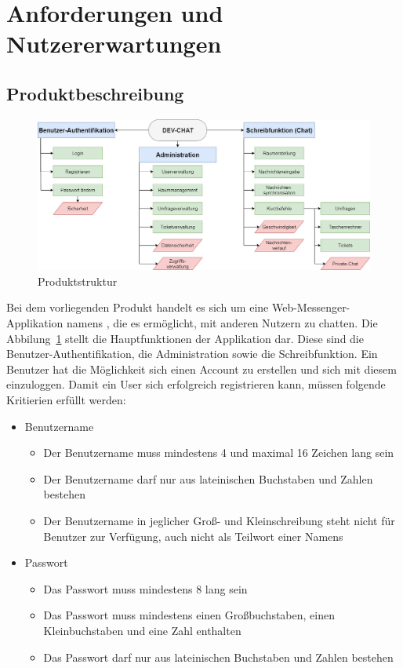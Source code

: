 \section{Anforderungen und Nutzererwartungen}

\subsection{Produktbeschreibung}
\begin{figure}
  \centering
  \includegraphics[width=1\textwidth, keepaspectratio]{images/Produktstruktur.png}
  \caption{Produktstruktur}
  \label{fig:Produktstruktur}
\end{figure}
Bei dem vorliegenden Produkt handelt es sich um eine Web-Messenger-Applikation namens , die es ermöglicht, mit anderen Nutzern zu chatten.
Die Abbilung~\ref{fig:Produktstruktur} stellt die Hauptfunktionen der Applikation dar.
Diese sind die Benutzer-Authentifikation, die Administration sowie die Schreibfunktion.
Ein Benutzer hat die Möglichkeit sich einen Account zu erstellen und sich mit diesem einzuloggen.
Damit ein User sich erfolgreich registrieren kann, müssen folgende Kritierien erfüllt werden:
\begin{itemize}
  \item Benutzername
  \begin{itemize}
    \item Der Benutzername muss mindestens 4 und maximal 16 Zeichen lang sein
    \item Der Benutzername darf nur aus lateinischen Buchstaben und Zahlen bestehen
    \item Der Benutzername  in jeglicher Groß- und Kleinschreibung steht nicht für Benutzer zur Verfügung, auch nicht als Teilwort einer Namens
  \end{itemize}
  \item Passwort
  \begin{itemize}
    \item Das Passwort muss mindestens 8 lang sein
    \item Das Passwort muss mindestens einen Großbuchstaben, einen Kleinbuchstaben und eine Zahl enthalten
    \item Das Passwort darf nur aus lateinischen Buchstaben und Zahlen bestehen
  \end{itemize}
\end{itemize}  
